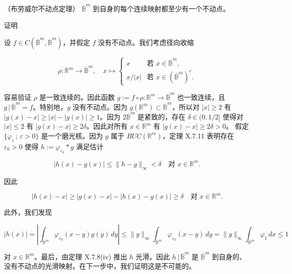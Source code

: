 \begin{theorem}

（布劳威尔不动点定理） $ \overline{\mathbb{B}}^m $ 到自身的每个连续映射都至少有一个不动点。

证明

\begin{subitems}
\item

设 $ f\in C(\overline{\mathbb{B}}^m,\overline{\mathbb{B}}^m) $，并假定 $ f $ 没有不动点。我们考虑径向收缩

\begin{equation*}
\rho : \mathbb{R}^m\to\overline{\mathbb{B}}^m,\quad x\mapsto \begin{cases} x & \text{若 } x\in\overline{\mathbb{B}}^m, \\ x/|x| & \text{若 } x\in(\overline{\mathbb{B}}^m)^c. \end{cases}
\end{equation*}

容易验证 $ \rho $ 是一致连续的。因此函数 $ g := f\circ\rho: \mathbb{R}^m\to\overline{\mathbb{B}}^m $ 也一致连续，且 $ g\,|\,\overline{\mathbb{B}}^m = f $。特别地，$ g $ 没有不动点。因为 $ g(\mathbb{R}^m)\subset\overline{\mathbb{B}}^m $，所以对 $ |x|\ge 2 $ 有 $ |g(x) - x|\ge |x| - |g(x)|\ge 1 $。因为 $ 2\overline{\mathbb{B}}^m $ 是紧致的，存在 $ \delta\in(0,1/2] $ 使得对 $ |x|\le 2 $ 有 $ |g(x) - x|\ge 2\delta $。因此对所有 $ x\in\mathbb{R}^m $ 有 $ |g(x) - x|\ge 2\delta > 0 $。
假定 $ \{\varphi_\varepsilon\,;\,\varepsilon > 0\} $ 是一个磨光核。因为 $ g $ 属于 $ BUC(\mathbb{R}^m) $，定理 X.7.11 表明存在 $ \varepsilon_0 > 0 $ 使得 $ h := \varphi_{\varepsilon_0} * g $ 满足估计

\[
|h(x) - g(x)|\le \|h - g\|_\infty < \delta \quad \text{对 } x\in\mathbb{R}^m .
\]

因此

\[
|h(x) - x|\ge |g(x) - x| - |h(x) - g(x)|\ge \delta \quad \text{对 } x\in\mathbb{R}^m .
\]

此外，我们发现

\[
|h(x)| = \left|\int_{\mathbb{R}^m}\varphi_{\varepsilon_0}(x - y)g(y)\,dy\right|\le \|g\|_\infty\int_{\mathbb{R}^m}\varphi_{\varepsilon_0}(x - y)\,dy = \|g\|_\infty\int_{\mathbb{R}^m}\varphi_1\,dx\le 1
\]

对 $ x\in\mathbb{R}^m $。最后，由定理 X.7.8(iv) 推出 $ h $ 光滑。因此 $ h\,|\,\overline{\mathbb{B}}^m $ 是 $ \overline{\mathbb{B}}^m $ 到自身的、没有不动点的光滑映射。在下一步中，我们证明这是不可能的。


\end{subitems}
\end{theorem}
